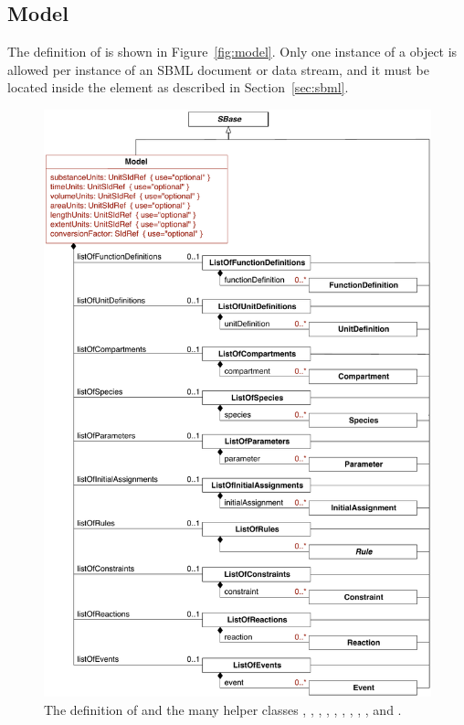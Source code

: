 \subsection{Model}
\label{sec:model}

The definition of \Model is shown in Figure~\vref{fig:model}.
Only one instance of a \Model object is allowed per instance of an
SBML \thisLV document or data stream, and it must be located
inside the  element as described in
Section~\ref{sec:sbml}.

\begin{figure}[htbp]
  \centering
  \includegraphics[scale=0.75]{figs/model-uml}
  \caption{The definition of \Model and the many helper
      classes \ListOfFunctionDefinitions, \ListOfUnitDefinitions,
      \ListOfCompartments, \ListOfSpecies, \ListOfParameters,
      \ListOfInitialAssignments, \ListOfRules, \ListOfConstraints,
      \ListOfReactions, and \ListOfEvents.}
  \label{fig:model}
\end{figure}

